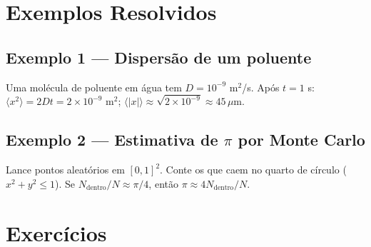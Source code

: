 \documentclass[12pt,a4paper]{article}
\begin{document}
\section*{Exemplos Resolvidos}

\subsection*{Exemplo 1 --- Dispers\~ao de um poluente}
Uma mol\'ecula de poluente em \'agua tem $D = 10^{-9}$ m$^2$/s. Ap\'os $t=1$ s:
$\langle x^2\rangle = 2Dt = 2\times10^{-9}$ m$^2$; $\langle|x|\rangle \approx \sqrt{2\times10^{-9}} \approx 45\,\mu$m.

\subsection*{Exemplo 2 --- Estimativa de $\pi$ por Monte Carlo}
Lance pontos aleat\'orios em $[0,1]^2$. Conte os que caem no quarto de c\'irculo ($x^2+y^2\le1$). Se $N_\text{dentro}/N \approx \pi/4$, ent\~ao $\pi \approx 4N_\text{dentro}/N$.

\section*{Exerc\'icios}
\end{document}
